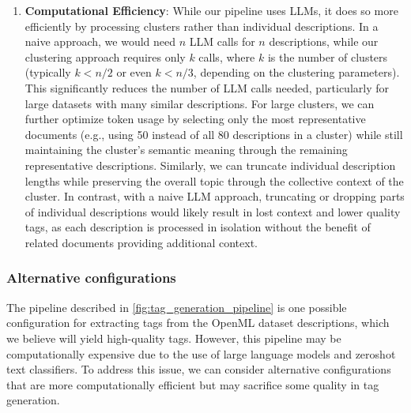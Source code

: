 \begin{enumerate}
    \item \textbf{Computational Efficiency}: While our pipeline uses LLMs, it does so more efficiently by processing clusters rather than individual descriptions. In a naive approach, we would need $n$ LLM calls for $n$ descriptions, while our clustering approach requires only $k$ calls, where $k$ is the number of clusters (typically $k < n/2$ or even $k < n/3$, depending on the clustering parameters). This significantly reduces the number of LLM calls needed, particularly for large datasets with many similar descriptions. For large clusters, we can further optimize token usage by selecting only the most representative documents (e.g., using 50 instead of all 80 descriptions in a cluster) while still maintaining the cluster's semantic meaning through the remaining representative descriptions. Similarly, we can truncate individual description lengths while preserving the overall topic through the collective context of the cluster. In contrast, with a naive LLM approach, truncating or dropping parts of individual descriptions would likely result in lost context and lower quality tags, as each description is processed in isolation without the benefit of related documents providing additional context.

\end{enumerate}

\subsubsection{Alternative configurations}
The pipeline described in \cref{fig:tag_generation_pipeline} is one possible configuration for extracting tags from the OpenML dataset descriptions, which we believe will yield high-quality tags. However, this pipeline may be computationally expensive due to the use of large language models and zeroshot text classifiers. To address this issue, we can consider alternative configurations that are more computationally efficient but may sacrifice some quality in tag generation.


